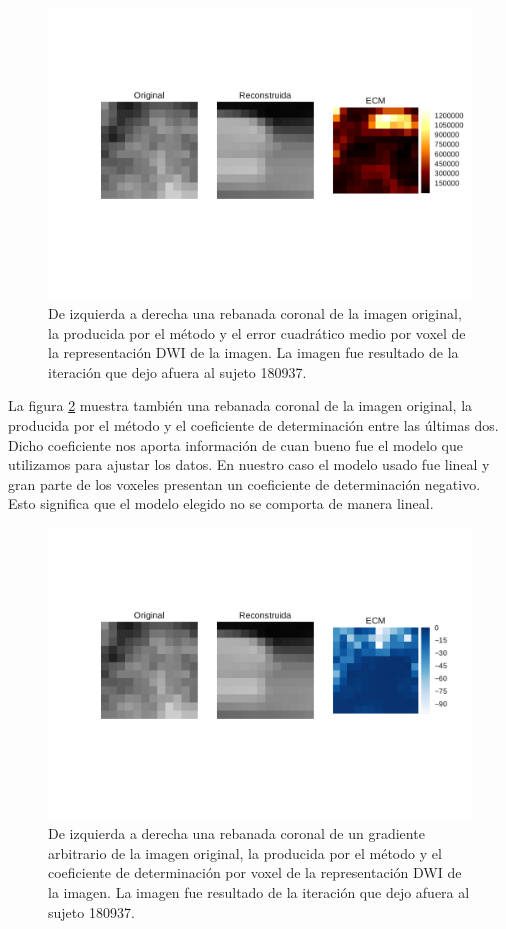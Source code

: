 \documentclass[a4paper,10pt]{article}%
\begin{document}
\begin{figure}[H]
\centering        
\includegraphics[scale=0.7]{mse_yhr_s180937_voxels_cmp.pdf}
\caption{De izquierda a derecha una rebanada coronal de la imagen 
original, la producida por el m\'etodo y el error cuadrático medio por voxel de la 
representación DWI de la imagen. La imagen fue resultado de la iteración que dejo afuera al sujeto 180937.}
\label{mse_cmp}
\end{figure}


La figura \ref{cdet_cmp} muestra también una rebanada coronal de la imagen 
original, la producida por el m\'etodo y el coeficiente de determinación entre las \'ultimas dos. 
Dicho coeficiente nos aporta información de cuan bueno fue el modelo que utilizamos para ajustar 
los datos. En nuestro caso el modelo usado fue lineal y gran parte de los voxeles presentan un 
coeficiente de determinación negativo. Esto significa que el modelo elegido no se comporta de manera lineal.

\begin{figure}[H]
\centering        
\includegraphics[scale=0.7]{cdet_yhr_s180937_voxels_cmp.pdf}
\caption{De izquierda a derecha una rebanada coronal de un gradiente arbitrario de la imagen 
original, la producida por el m\'etodo y el coeficiente de determinación por voxel de la 
representación DWI de la imagen. La imagen fue resultado de la iteración que dejo afuera al sujeto 180937.}
\label{cdet_cmp}
\end{figure}
\end{document}
